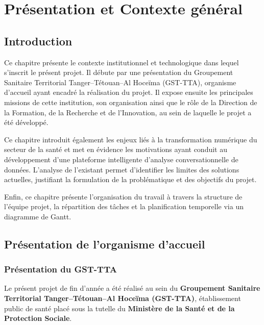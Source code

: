 \chapter{Présentation et Contexte général}

\section{Introduction}

Ce chapitre présente le contexte institutionnel et technologique dans lequel s'inscrit le présent projet. Il débute par une présentation du Groupement Sanitaire Territorial Tanger--Tétouan--Al Hoceïma (GST-TTA), organisme d'accueil ayant encadré la réalisation du projet. Il expose ensuite les principales missions de cette institution, son organisation ainsi que le rôle de la Direction de la Formation, de la Recherche et de l'Innovation, au sein de laquelle le projet a été développé.

Ce chapitre introduit également les enjeux liés à la transformation numérique du secteur de la santé et met en évidence les motivations ayant conduit au développement d'une plateforme intelligente d'analyse conversationnelle de données. L'analyse de l'existant permet d'identifier les limites des solutions actuelles, justifiant la formulation de la problématique et des objectifs du projet.

Enfin, ce chapitre présente l'organisation du travail à travers la structure de l'équipe projet, la répartition des tâches et la planification temporelle via un diagramme de Gantt.

\vspace{0.3cm}

\section{Présentation de l'organisme d'accueil}

\subsection{Présentation du GST-TTA}

Le présent projet de fin d'année a été réalisé au sein du \textbf{Groupement Sanitaire Territorial Tanger--Tétouan--Al Hoceïma (GST-TTA)}, établissement public de santé placé sous la tutelle du \textbf{Ministère de la Santé et de la Protection Sociale}.

